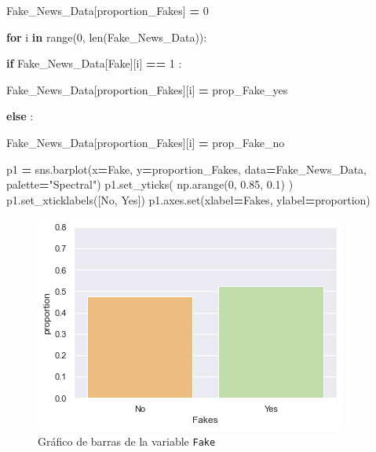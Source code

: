 \documentclass[
  11pt,
  a4paper,
]{article}
\newenvironment{Shaded}{\begin{snugshade}}{\end{snugshade}}
\newcommand{\BuiltInTok}[1]{#1}
\newcommand{\ControlFlowTok}[1]{\textcolor[rgb]{0.13,0.29,0.53}{\textbf{#1}}}
\newcommand{\DecValTok}[1]{\textcolor[rgb]{0.00,0.00,0.81}{#1}}
\newcommand{\FloatTok}[1]{\textcolor[rgb]{0.00,0.00,0.81}{#1}}
\newcommand{\KeywordTok}[1]{\textcolor[rgb]{0.13,0.29,0.53}{\textbf{#1}}}
\newcommand{\NormalTok}[1]{#1}
\newcommand{\OperatorTok}[1]{\textcolor[rgb]{0.81,0.36,0.00}{\textbf{#1}}}
\newcommand{\StringTok}[1]{\textcolor[rgb]{0.31,0.60,0.02}{#1}}
\begin{document}
\begin{Shaded}
\begin{Highlighting}[]
\NormalTok{Fake\_News\_Data[}\StringTok{\textquotesingle{}proportion\_Fakes\textquotesingle{}}\NormalTok{] }\OperatorTok{=} \DecValTok{0}


\ControlFlowTok{for}\NormalTok{ i }\KeywordTok{in} \BuiltInTok{range}\NormalTok{(}\DecValTok{0}\NormalTok{, }\BuiltInTok{len}\NormalTok{(Fake\_News\_Data)):}

    \ControlFlowTok{if}\NormalTok{ Fake\_News\_Data[}\StringTok{\textquotesingle{}Fake\textquotesingle{}}\NormalTok{][i] }\OperatorTok{==} \DecValTok{1}\NormalTok{ :}

\NormalTok{        Fake\_News\_Data[}\StringTok{\textquotesingle{}proportion\_Fakes\textquotesingle{}}\NormalTok{][i] }\OperatorTok{=}\NormalTok{ prop\_Fake\_yes}

    \ControlFlowTok{else}\NormalTok{ :}

\NormalTok{        Fake\_News\_Data[}\StringTok{\textquotesingle{}proportion\_Fakes\textquotesingle{}}\NormalTok{][i] }\OperatorTok{=}\NormalTok{ prop\_Fake\_no}
\end{Highlighting}
\end{Shaded}

\begin{Shaded}
\begin{Highlighting}[]
\NormalTok{p1 }\OperatorTok{=}\NormalTok{ sns.barplot(x}\OperatorTok{=}\StringTok{\textquotesingle{}Fake\textquotesingle{}}\NormalTok{, y}\OperatorTok{=}\StringTok{\textquotesingle{}proportion\_Fakes\textquotesingle{}}\NormalTok{, data}\OperatorTok{=}\NormalTok{Fake\_News\_Data, palette}\OperatorTok{=}\StringTok{"Spectral"}\NormalTok{) }
\NormalTok{p1.set\_yticks( np.arange(}\DecValTok{0}\NormalTok{, }\FloatTok{0.85}\NormalTok{, }\FloatTok{0.1}\NormalTok{)  )}
\NormalTok{p1.set\_xticklabels([}\StringTok{\textquotesingle{}No\textquotesingle{}}\NormalTok{, }\StringTok{\textquotesingle{}Yes\textquotesingle{}}\NormalTok{])}
\NormalTok{p1.axes.}\BuiltInTok{set}\NormalTok{(xlabel}\OperatorTok{=}\StringTok{\textquotesingle{}Fakes\textquotesingle{}}\NormalTok{, ylabel}\OperatorTok{=}\StringTok{\textquotesingle{}proportion\textquotesingle{}}\NormalTok{)}
\end{Highlighting}
\end{Shaded}

\begin{figure}
\centering
\includegraphics{output_15_1.png}
\caption{Gráfico de barras de la variable \texttt{Fake}}
\end{figure}
\end{document}
